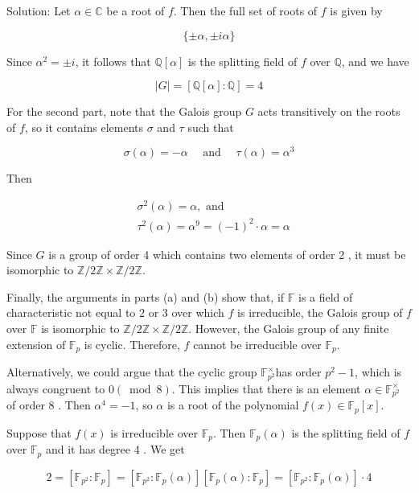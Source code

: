 \documentclass[10pt]{article}
\begin{document}
Solution: Let $\alpha \in \mathbb{C}$ be a root of $f$. Then the full set of roots of $f$ is given by

$$
\{ \pm \alpha, \pm i \alpha\}
$$

Since $\alpha^{2}= \pm i$, it follows that $\mathbb{Q}[\alpha]$ is the splitting field of $f$ over $\mathbb{Q}$, and we have

$$
|G|=[\mathbb{Q}[\alpha]: \mathbb{Q}]=4
$$

For the second part, note that the Galois group $G$ acts transitively on the roots of $f$, so it contains elements $\sigma$ and $\tau$ such that

$$
\sigma(\alpha)=-\alpha \quad \text { and } \quad \tau(\alpha)=\alpha^{3}
$$

Then

$$
\begin{aligned}
& \sigma^{2}(\alpha)=\alpha, \text { and } \\
& \tau^{2}(\alpha)=\alpha^{9}=(-1)^{2} \cdot \alpha=\alpha
\end{aligned}
$$

Since $G$ is a group of order 4 which contains two elements of order 2 , it must be isomorphic to $\mathbb{Z} / 2 \mathbb{Z} \times \mathbb{Z} / 2 \mathbb{Z}$.

Finally, the arguments in parts (a) and (b) show that, if $\mathbb{F}$ is a field of characteristic not equal to 2 or 3 over which $f$ is irreducible, the Galois group of $f$ over $\mathbb{F}$ is isomorphic to $\mathbb{Z} / 2 \mathbb{Z} \times \mathbb{Z} / 2 \mathbb{Z}$. However, the Galois group of any finite extension of $\mathbb{F}_{p}$ is cyclic. Therefore, $f$ cannot be irreducible over $\mathbb{F}_{p}$.

Alternatively, we could argue that the cyclic group $\mathbb{F}_{p^{2}}^{\times}$has order $p^{2}-1$, which is always congruent to $0(\bmod 8)$. This implies that there is an element $\alpha \in \mathbb{F}_{p^{2}}^{\times}$ of order 8 . Then $\alpha^{4}=-1$, so $\alpha$ is a root of the polynomial $f(x) \in \mathbb{F}_{p}[x]$.

Suppose that $f(x)$ is irreducible over $\mathbb{F}_{p}$. Then $\mathbb{F}_{p}(\alpha)$ is the splitting field of $f$ over $\mathbb{F}_{p}$ and it has degree 4 . We get

$$
2=\left[\mathbb{F}_{p^{2}}: \mathbb{F}_{p}\right]=\left[\mathbb{F}_{p^{2}}: \mathbb{F}_{p}(\alpha)\right]\left[\mathbb{F}_{p}(\alpha): \mathbb{F}_{p}\right]=\left[\mathbb{F}_{p^{2}}: \mathbb{F}_{p}(\alpha)\right] \cdot 4
$$
\end{document}
